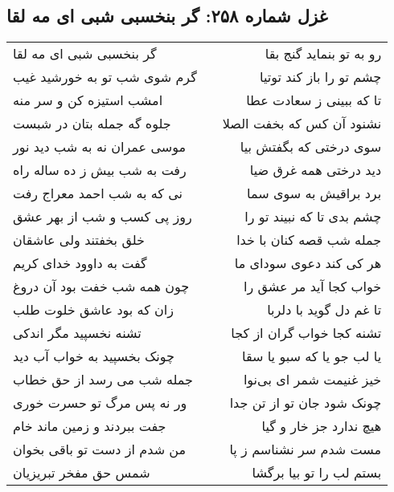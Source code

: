 \begin{center}
\section*{غزل شماره ۲۵۸: گر بنخسبی شبی ای مه لقا}
\label{sec:0258}
\begin{longtable}{l p{0.5cm} r}
گر بنخسبی شبی ای مه لقا
&&
رو به تو بنماید گنج بقا
\\
گرم شوی شب تو به خورشید غیب
&&
چشم تو را باز کند توتیا
\\
امشب استیزه کن و سر منه
&&
تا که ببینی ز سعادت عطا
\\
جلوه گه جمله بتان در شبست
&&
نشنود آن کس که بخفت الصلا
\\
موسی عمران نه به شب دید نور
&&
سوی درختی که بگفتش بیا
\\
رفت به شب بیش ز ده ساله راه
&&
دید درختی همه غرق ضیا
\\
نی که به شب احمد معراج رفت
&&
برد براقیش به سوی سما
\\
روز پی کسب و شب از بهر عشق
&&
چشم بدی تا که نبیند تو را
\\
خلق بخفتند ولی عاشقان
&&
جمله شب قصه کنان با خدا
\\
گفت به داوود خدای کریم
&&
هر کی کند دعوی سودای ما
\\
چون همه شب خفت بود آن دروغ
&&
خواب کجا آید مر عشق را
\\
زان که بود عاشق خلوت طلب
&&
تا غم دل گوید با دلربا
\\
تشنه نخسپید مگر اندکی
&&
تشنه کجا خواب گران از کجا
\\
چونک بخسپید به خواب آب دید
&&
یا لب جو یا که سبو یا سقا
\\
جمله شب می رسد از حق خطاب
&&
خیز غنیمت شمر ای بی‌نوا
\\
ور نه پس مرگ تو حسرت خوری
&&
چونک شود جان تو از تن جدا
\\
جفت ببردند و زمین ماند خام
&&
هیچ ندارد جز خار و گیا
\\
من شدم از دست تو باقی بخوان
&&
مست شدم سر نشناسم ز پا
\\
شمس حق مفخر تبریزیان
&&
بستم لب را تو بیا برگشا
\\
\end{longtable}
\end{center}
